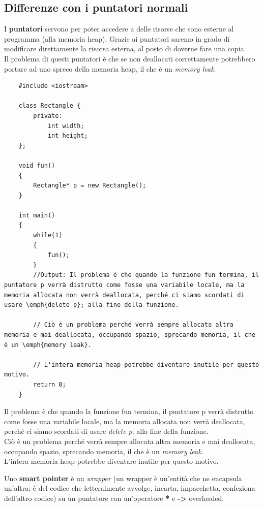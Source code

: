 \subsection{Differenze con i puntatori normali}

\textsf{\small I \textbf{puntatori} servono per poter accedere a delle risorse che sono esterne al programma (alla memoria heap). Grazie ai puntatori saremo in grado di modificare direttamente la risorsa esterna, al posto di doverne fare una copia.} \\

\textsf{\small Il problema di questi puntatori è che se non deallocati correttamente potrebbero portare ad uno spreco della memoria heap, il che è un \emph{memory leak}.} \\

\begin{lstlisting}
	#include <iostream>
	
	class Rectangle {
		private:
			int width;
			int height;
	};

	void fun()
	{
		Rectangle* p = new Rectangle();
	}

	int main()
	{
		while(1)
		{
			fun();
		}
		//Output: Il problema è che quando la funzione fun termina, il puntatore p verrà distrutto come fosse una variabile locale, ma la memoria allocata non verrà deallocata, perché ci siamo scordati di usare \emph{delete p}; alla fine della funzione.
		
		// Ciò è un problema perché verrà sempre allocata altra memoria e mai deallocata, occupando spazio, sprecando memoria, il che è un \emph{memory leak}.
		
		// L'intera memoria heap potrebbe diventare inutile per questo motivo. 
		return 0;
	}
\end{lstlisting}

\textsf{\small Il problema è che quando la funzione fun termina, il puntatore p verrà distrutto come fosse una variabile locale, ma la memoria allocata non verrà deallocata, perché ci siamo scordati di usare \emph{delete p}; alla fine della funzione.} \\

\textsf{\small Ciò è un problema perché verrà sempre allocata altra memoria e mai deallocata, occupando spazio, sprecando memoria, il che è un \emph{memory leak}.} \\

\textsf{\small L'intera memoria heap potrebbe diventare inutile per questo motivo. } \break

\textsf{\small Uno \textbf{smart pointer} è un \emph{wrapper} (un wrapper è un'entità che ne encapsula un'altra; è del codice che letteralmente avvolge, incarta, impacchetta, confeziona dell'altro codice) su un puntatore con un'operatore \textbf{*} e \textbf{->} overloaded.} \\


